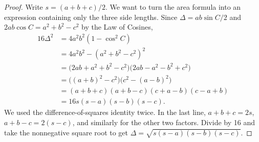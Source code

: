 
\begin{proof}
Write $s=(a+b+c)/2$. We want to turn the area formula into an expression
containing only the three side lengths. Since $\Delta=ab\sin C/2$ and
$2ab\cos C=a^2+b^2-c^2$ by the Law of Cosines,
\begin{align*}
16\Delta^2
&=4a^2b^2(1-\cos^2 C)\\
&=4a^2b^2-(a^2+b^2-c^2)^2\\
&=\bigl(2ab+a^2+b^2-c^2\bigr)
  \bigl(2ab-a^2-b^2+c^2\bigr)\\
&=\bigl((a+b)^2-c^2\bigr)\bigl(c^2-(a-b)^2\bigr)\\
&=(a+b+c)(a+b-c)(c+a-b)(c-a+b)\\
&=16s(s-a)(s-b)(s-c).
\end{align*}
We used the difference-of-squares identity twice. In the last line,
$a+b+c=2s$, $a+b-c=2(s-c)$, and similarly for the other two factors.
Divide by 16 and take the nonnegative square root to get
$\Delta=\sqrt{s(s-a)(s-b)(s-c)}$.
\end{proof}



